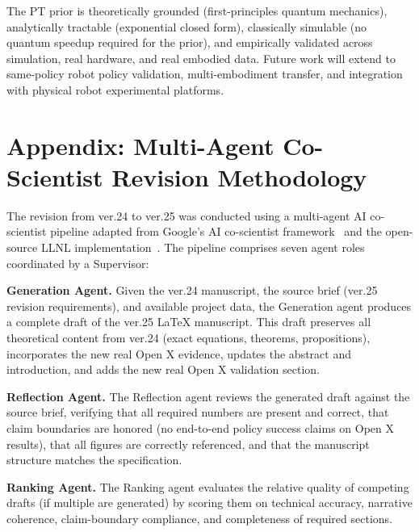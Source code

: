 \documentclass[10pt]{article}
\begin{document}
The PT prior is theoretically grounded (first-principles quantum mechanics),
analytically tractable (exponential closed form), classically simulable (no quantum
speedup required for the prior), and empirically validated across simulation, real
hardware, and real embodied data.  Future work will extend to same-policy robot
policy validation, multi-embodiment transfer, and integration with physical robot
experimental platforms.




\appendix
\section*{Appendix: Multi-Agent Co-Scientist Revision Methodology}
\label{app:coscientist}

The revision from ver.24 to ver.25 was conducted using a multi-agent AI co-scientist
pipeline adapted from Google's AI co-scientist framework~\citep{google-ai-coscientist}
and the open-source LLNL implementation~\citep{llnl-open-ai-coscientist}.  The pipeline
comprises seven agent roles coordinated by a Supervisor:

\medskip\noindent\textbf{Generation Agent.}  Given the ver.24 manuscript, the source
brief (ver.25 revision requirements), and available project data, the Generation agent
produces a complete draft of the ver.25 LaTeX manuscript.  This draft preserves all
theoretical content from ver.24 (exact equations, theorems, propositions), incorporates
the new real Open X evidence, updates the abstract and introduction, and adds the new
real Open X validation section.

\medskip\noindent\textbf{Reflection Agent.}  The Reflection agent reviews the generated
draft against the source brief, verifying that all required numbers are present and
correct, that claim boundaries are honored (no end-to-end policy success claims on Open X
results), that all figures are correctly referenced, and that the manuscript structure
matches the specification.

\medskip\noindent\textbf{Ranking Agent.}  The Ranking agent evaluates the relative
quality of competing drafts (if multiple are generated) by scoring them on technical
accuracy, narrative coherence, claim-boundary compliance, and completeness of required
sections.
\end{document}
